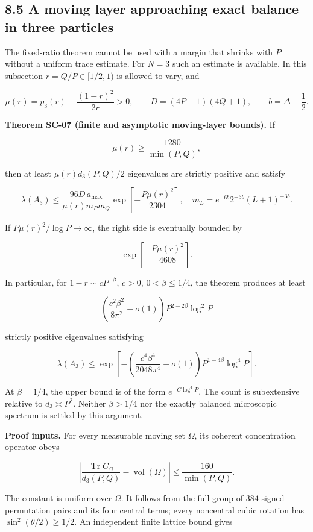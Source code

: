 \documentclass[a4paper,11pt]{article}
\numberwithin{equation}{section}
\begin{document}
\hypertarget{a-moving-layer-approaching-exact-balance-in-three-particles}{%
\subsection{8.5 A moving layer approaching exact balance in three particles}\label{a-moving-layer-approaching-exact-balance-in-three-particles}}

The fixed-ratio theorem cannot be used with a margin that shrinks with \(P\) without a uniform trace estimate. For \(N=3\) such an estimate is available. In this subsection \(r=Q/P\in[1/2,1)\) is allowed to vary, and

\[
\mu(r)=p_3(r)-\frac{(1-r)^2}{2r}>0,\qquad
D=(4P+1)(4Q+1),\qquad b=\Delta-\frac12.
\]

\textbf{Theorem SC-07 (finite and asymptotic moving-layer bounds).} If

\[
\mu(r)\geq\frac{1280}{\min(P,Q)},
\]

then at least \(\mu(r)d_3(P,Q)/2\) eigenvalues are strictly positive and satisfy

\[
\lambda(A_3)\leq
\frac{96D\,a_{\max}}{\mu(r)m_Pm_Q}
\exp\!\left[-\frac{P\mu(r)^2}{2304}\right],
\quad m_L=e^{-6b}2^{-3b}(L+1)^{-3b}.
\]

If \(P\mu(r)^2/\log P\to\infty\), the right side is eventually bounded by

\[
\exp\!\left[-\frac{P\mu(r)^2}{4608}\right].
\]

In particular, for \(1-r\sim cP^{-\beta}\), \(c>0\), \(0<\beta\leq1/4\), the theorem produces at least

\[
\left(\frac{c^2\beta^2}{8\pi^2}+o(1)\right)
P^{2-2\beta}\log^2P
\]

strictly positive eigenvalues satisfying

\[
\lambda(A_3)\leq
\exp\!\left[-\left(\frac{c^4\beta^4}{2048\pi^4}+o(1)\right)
P^{1-4\beta}\log^4P\right].
\]

At \(\beta=1/4\), the upper bound is of the form \(e^{-C\log^4P}\). The count is subextensive relative to \(d_3\asymp P^2\). Neither \(\beta>1/4\) nor the exactly balanced microscopic spectrum is settled by this argument.

\textbf{Proof inputs.} For every measurable moving set \(\Omega\), its coherent concentration operator obeys

\[
\left|\frac{\operatorname{Tr}C_\Omega}{d_3(P,Q)}-\operatorname{vol}(\Omega)\right|
\leq\frac{160}{\min(P,Q)}.
\]

The constant is uniform over \(\Omega\). It follows from the full group of \(384\) signed permutation pairs and its four central terms; every noncentral cubic rotation has \(\sin^2(\theta/2)\geq1/2\). An independent finite lattice bound gives
\end{document}
